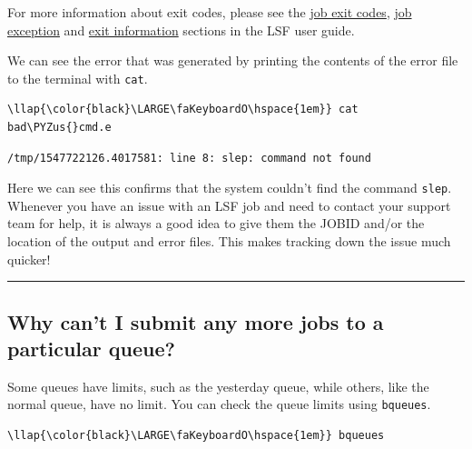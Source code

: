 \documentclass[11pt]{article}
\def\PYZus{\char`\_}
\begin{document}
For more information about exit codes, please see the
\href{https://www.ibm.com/support/knowledgecenter/en/SSETD4_9.1.2/lsf_admin/job_exit_codes_lsf.html}{job
exit codes},
\href{https://www.ibm.com/support/knowledgecenter/en/SSETD4_9.1.2/lsf_admin/job_exception_lsf.html}{job
exception} and
\href{https://www.ibm.com/support/knowledgecenter/en/SSETD4_9.1.2/lsf_admin/job_exit_info_view_logged.html}{exit
information} sections in the LSF user guide.

    We can see the error that was generated by printing the contents of the
error file to the terminal with \texttt{cat}.

\begin{terminalinput}
\begin{Verbatim}[commandchars=\\\{\}]
\llap{\color{black}\LARGE\faKeyboardO\hspace{1em}} cat bad\PYZus{}cmd.e
\end{Verbatim}
\end{terminalinput}


    \begin{verbatim}
/tmp/1547722126.4017581: line 8: slep: command not found
\end{verbatim}

    Here we can see this confirms that the system couldn't find the command
\texttt{slep}. Whenever you have an issue with an LSF job and need to
contact your support team for help, it is always a good idea to give
them the JOBID and/or the location of the output and error files. This
makes tracking down the issue much quicker!

    \begin{center}\rule{0.5\linewidth}{\linethickness}\end{center}

    \subsection{Why can't I submit any more jobs to a particular
queue?}\label{why-cant-i-submit-any-more-jobs-to-a-particular-queue}

Some queues have limits, such as the yesterday queue, while others, like
the normal queue, have no limit. You can check the queue limits using
\texttt{bqueues}.

\begin{terminalinput}
\begin{Verbatim}[commandchars=\\\{\}]
\llap{\color{black}\LARGE\faKeyboardO\hspace{1em}} bqueues
\end{Verbatim}
\end{terminalinput}
\end{document}
